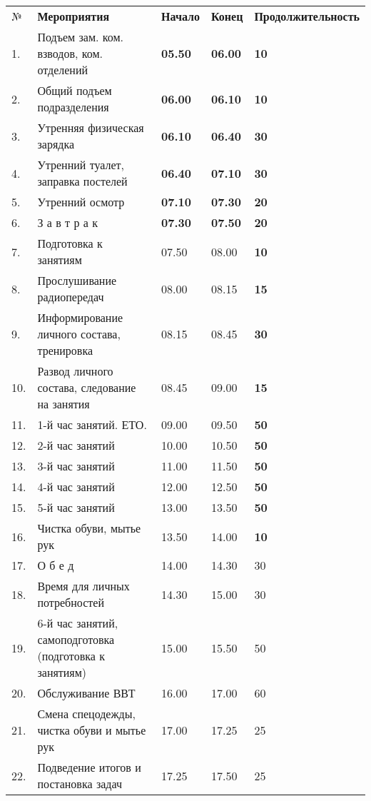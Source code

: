 \documentclass[12pt,a4paper]{report}
\begin{document}
\begin{tabular} {l | l | l | l | l}
	№ & \textbf{Мероприятия} & \textbf{Начало}  & \textbf{Конец} & \textbf{Продолжительность}  \\
	1. &  Подъем зам. ком.  взводов, ком. отделений &  \textbf{05.50} &  \textbf{06.00} & \textbf{10} \\
	2. &  Общий подъем подразделения  &  \textbf{06.00} &  \textbf{06.10} &  \textbf{10} \\
	3. &  Утренняя физическая зарядка & \textbf{06.10} & \textbf{06.40} & \textbf{30\textbf{}} \\
	4. &  Утренний туалет, заправка постелей &  \textbf{06.40} &  \textbf{07.10}  & \textbf{30} \\
	5. &  Утренний осмотр &  \textbf{07.10} &  \textbf{07.30} &  \textbf{20} \\
	6. &  З а в т р а к &  \textbf{07.30}  & \textbf{07.50} &  \textbf{20} \\
	7. &  Подготовка к занятиям  & 07.50 &  08.00 &  \textbf{10} \\
	8. &  Прослушивание радиопередач &  08.00 &  08.15  & \textbf{15} \\
	9. &  Информирование личного состава, тренировка &  08.15  & 08.45  & \textbf{30} \\
	10. & Развод личного состава, следование на занятия  & 08.45 & 09.00 & \textbf{15} \\
	11. & 1-й час занятий. ЕТО.  & 09.00 & 09.50 & \textbf{50} \\
	12. & 2-й час занятий & 10.00 & 10.50 & \textbf{50} \\
	13. & 3-й час занятий & 11.00 & 11.50 & \textbf{50} \\
	14. & 4-й час занятий & 12.00 & 12.50 & \textbf{50} \\
	15. & 5-й час занятий & 13.00 & 13.50 & \textbf{50} \\
	16. & Чистка обуви, мытье рук & 13.50 & 14.00 & \textbf{10} \\
	17. & О  б  е  д & 14.00 & 14.30 & 30 \\
	18. & Время для личных потребностей & 14.30 & 15.00 & 30 \\
	19. & 6-й час занятий, самоподготовка (подготовка к занятиям) & 15.00 & 15.50 & 50 \\
	20. & Обслуживание ВВТ & 16.00 & 17.00 & 60 \\
	21. & Смена спецодежды, чистка обуви и мытье рук & 17.00 & 17.25 & 25 \\
	22. & Подведение итогов и постановка задач & 17.25 & 17.50 & 25 \\

\end{tabular}
\end{document}
